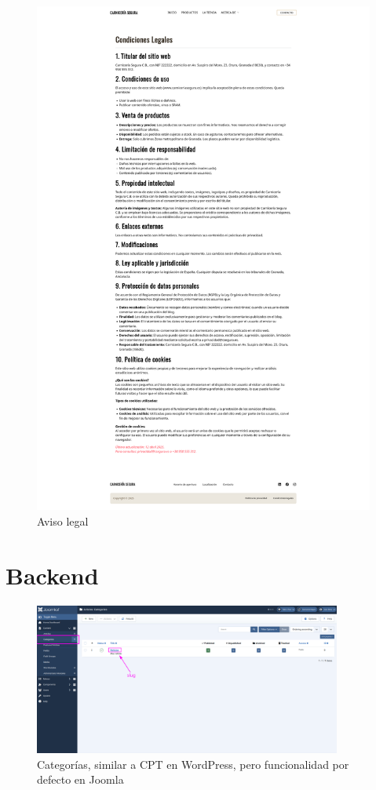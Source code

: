 \documentclass[a4paper]{article}
\begin{document}
\begin{figure}[H]
    \centering
    \includegraphics[width=1\textwidth]{images/legal-conditions.png}
    \caption{Aviso legal}
\end{figure}


\section{Backend}

\begin{figure}[H]
    \centering
    \includegraphics[width=0.9\textwidth]{images/backend-category.png}
    \captionsetup{width=0.85\textwidth}
    \caption{Categorías, similar a CPT en WordPress, pero funcionalidad por defecto en Joomla}
\end{figure}
\end{document}
